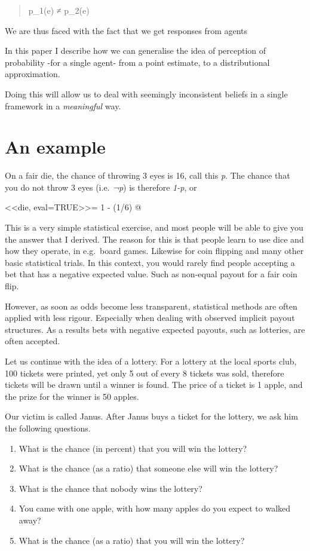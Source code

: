 \documentclass[draft.tex]{subfiles}
\begin{document}
\begin{quote}
p\_1(e) ≠ p\_2(e)
\end{quote}

We are thus faced with the fact that we get responses from agents

In this paper I describe how we can generalise the idea of perception of
probability -for a single agent- from a point estimate, to a
distributional approximation.

Doing this will allow us to deal with seemingly inconsistent beliefs in
a single framework in a \emph{meaningful} way.

\section{An example}

On a fair die, the chance of throwing 3 eyes is 16, call this \emph{p}.
The chance that you do not throw 3 eyes (i.e. \emph{¬p}) is therefore
\emph{1-p}, or

<<die, eval=TRUE>>=
1 - (1/6)
@

This is a very simple statistical exercise, and most people will be able
to give you the answer that I derived. The reason for this is that
people learn to use dice and how they operate, in e.g.~board games.
Likewise for coin flipping and many other basic statistical trials. In
this context, you would rarely find people accepting a bet that has a
negative expected value. Such as non-equal payout for a fair coin flip.

However, as soon as odds become less transparent, statistical methods
are often applied with less rigour. Especially when dealing with
observed implicit payout structures. As a results bets with negative
expected payouts, such as lotteries, are often accepted.

Let us continue with the idea of a lottery. For a lottery at the local
sports club, 100 tickets were printed, yet only 5 out of every 8 tickets
was sold, therefore tickets will be drawn until a winner is found. The
price of a ticket is 1 apple, and the prize for the winner is 50 apples.

Our victim is called Janus. After Janus buys a ticket for the lottery,
we ask him the following questions.

\begin{enumerate}
\def\labelenumi{\arabic{enumi}.}
\itemsep1pt\parskip0pt
\item
  What is the chance (in percent) that you will win the lottery?
\item
  What is the chance (as a ratio) that someone else will win the
  lottery?
\item
  What is the chance that nobody wins the lottery?
\item
  You came with one apple, with how many apples do you expect to walked
  away?
\item
  What is the chance (as a ratio) that you will win the lottery?
\end{enumerate}
\end{document}
